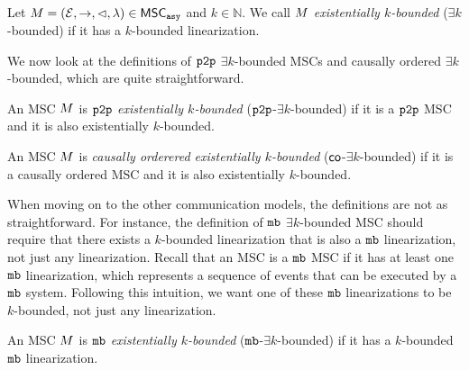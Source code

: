 \begin{definition}\label{def:ek_bounded_msc}
	Let $M = (\mathcal{E}, \rightarrow, \lhd, \lambda) \in \mathsf{MSC}_{\mathtt{asy}}$ and $k \in \mathbb{N}$. We call $M$ \emph{existentially $k$-bounded} ($\exists k$-bounded) if it has a $k$-bounded linearization.
\end{definition}
We now look at the definitions of $\mathtt{p2p}$ $\exists k$-bounded MSCs and causally ordered $\exists k$-bounded, which are quite straightforward.

\begin{definition}
	An MSC $M$ is \emph{$\mathtt{p2p}$ existentially $k$-bounded} ($\mathtt{p2p}$-$\exists k$-bounded) if it is a $\mathtt{p2p}$ MSC and it is also existentially $k$-bounded.
\end{definition}
\begin{definition}
	An MSC $M$ is \emph{causally orderered existentially $k$-bounded} ($\mathsf{co}$-$\exists k$-bounded) if it is a causally ordered MSC and it is also existentially $k$-bounded.
\end{definition}

When moving on to the other communication models, the definitions are not as straightforward. For instance, the definition of $\mathtt{mb}$ $\exists k$-bounded MSC should require that there exists a $k$-bounded linearization that is also a $\mathtt{mb}$ linearization, not just any linearization. Recall that an MSC is a $\mathtt{mb}$ MSC if it has at least one $\mathtt{mb}$ linearization, which represents a sequence of events that can be executed by a $\mathtt{mb}$ system. Following this intuition, we want one of these $\mathtt{mb}$ linearizations to be $k$-bounded, not just any linearization.

\begin{definition}
	An MSC $M$ is \emph{$\mathtt{mb}$ existentially $k$-bounded} ($\mathtt{mb}$-$\exists k$-bounded) if it has a $k$-bounded $\mathtt{mb}$ linearization.
\end{definition}

